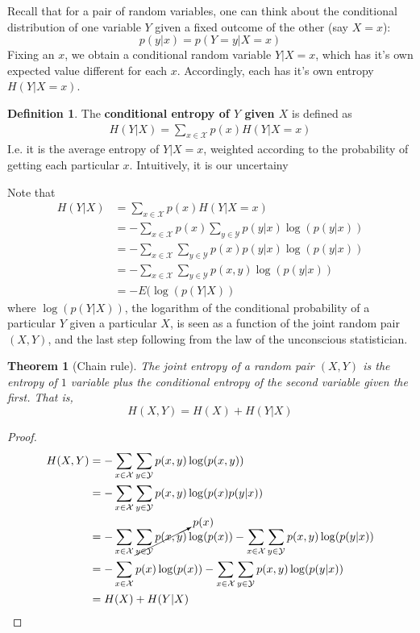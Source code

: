 \documentclass{article}
\theoremstyle{definition}
\newtheorem{definition}{Definition}[section]
\theoremstyle{plain}
\newtheorem{theorem}{Theorem}[section]
\begin{document}
Recall that for a pair of random variables, one can think about the conditional distribution of one variable $Y$ given a fixed outcome of the other (say $X = x$):
\[ p(y|x) = p(Y = y|X = x) \]
Fixing an $x$, we obtain a conditional random variable $Y|X=x$, which has it's own expected value different for each $x$. Accordingly, each has it's own entropy $H(Y|X=x)$. 
\begin{definition}
	The \textbf{conditional entropy of $Y$ given $X$} is defined as 
	\begin{align}
		H(Y|X) = \sum_{x \in \mathcal{X}} p(x)H(Y|X=x) 
	\end{align}
I.e. it is the average entropy of $Y|X=x$, weighted according to the probability of getting each particular $x$. Intuitively, it is our uncertainy 
\end{definition}
Note that 
\begin{align}
	H(Y|X) &= \sum_{x \in \mathcal{X}} p(x)H(Y|X=x) \\	
			&= -\sum_{x \in \mathcal{X}} p(x)\sum_{y \in \mathcal{Y}} p(y|x)\log(p(y|x)) \\
			&= -\sum_{x \in \mathcal{X}} \sum_{y \in \mathcal{Y}} p(x)p(y|x) \log(p(y|x)) \\
			&= -\sum_{x \in \mathcal{X}}\sum_{y \in \mathcal{Y}} p(x,y)\log(p(y|x)) \\ 
			&= -E(\log(p(Y|X)) 
\end{align}
where $\log(p(Y|X))$, the logarithm of the conditional probability of a particular $Y$ given a particular $X$, is seen as a function of the joint random pair $(X,Y)$, and the last step following from the law of the unconscious statistician.
\begin{theorem}[Chain rule]
	The joint entropy of a random pair $(X,Y)$ is the entropy of $1$ variable plus the conditional entropy of the second variable given the first. That is,  \[H(X,Y) = H(X) + H(Y|X) \]
\end{theorem}
\begin{proof}
	\begin{align}
		H(X,Y) &= -\sum_{x \in \mathcal{X}} \sum_{y \in \mathcal{Y}} p(x,y)\log(p(x,y)) \\
			&= -\sum_{x \in \mathcal{X}} \sum_{y \in \mathcal{Y}} p(x,y)\log(p(x)p(y|x)) \\
			&= -\sum_{x \in \mathcal{X}} \cancelto{p(x)}{\sum_{y \in \mathcal{Y}} p(x,y)}\log(p(x)) -\sum_{x \in \mathcal{X}} \sum_{y \in \mathcal{Y}} p(x,y)\log(p(y|x)) \\ 
		 	&= -\sum_{x \in \mathcal{X}} p(x)\log(p(x)) - \sum_{x \in \mathcal{X}} \sum_{y \in \mathcal{Y}} p(x,y)\log(p(y|x)) \\ 
		 	&= H(X) + H(Y|X)
	\end{align}
\end{proof}
\end{document}
